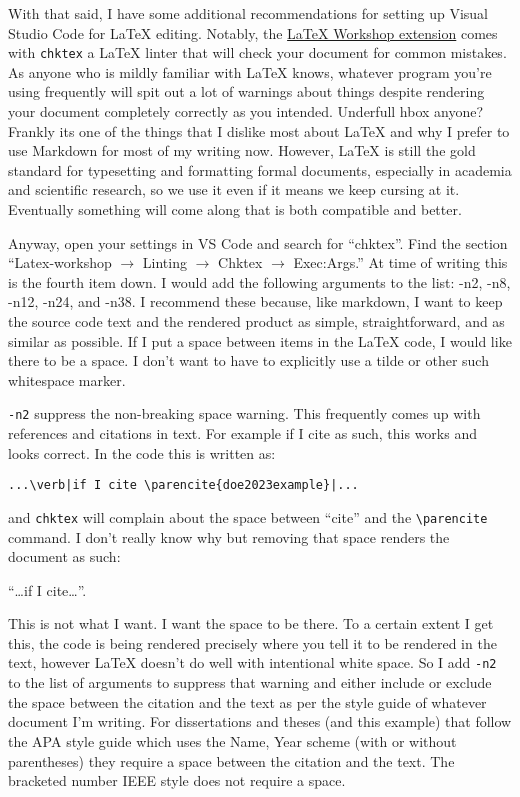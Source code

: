 \documentclass{thesis-dissertation}
\begin{document}
With that said, I have some additional recommendations for setting up Visual Studio Code for \LaTeX{} editing. Notably, the \href{https://marketplace.visualstudio.com/items/?itemName=James-Yu.latex-workshop}{LaTeX Workshop extension} comes with \texttt{chktex} a \LaTeX{} linter that will check your document for common mistakes. As anyone who is mildly familiar with \LaTeX{} knows, whatever program you're using frequently will spit out a lot of warnings about things despite rendering your document completely correctly as you intended. Underfull hbox anyone? Frankly its one of the things that I dislike most about \LaTeX{} and why I prefer to use Markdown for most of my writing now. However, \LaTeX{} is still the gold standard for typesetting and formatting formal documents, especially in academia and scientific research, so we use it even if it means we keep cursing at it. Eventually something will come along that is both compatible and better.

Anyway, open your settings in VS Code and search for ``chktex''. Find the section ``Latex-workshop \(\rightarrow\) Linting \(\rightarrow\) Chktex \(\rightarrow\) Exec:Args.'' At time of writing this is the fourth item down. I would add the following arguments to the list: -n2, -n8, -n12, -n24, and -n38. I recommend these because, like markdown, I want to keep the source code text and the rendered product as simple, straightforward, and as similar as possible. If I put a space between items in the \LaTeX{} code, I would like there to be a space. I don't want to have to explicitly use a tilde or other such whitespace marker. 

\texttt{-n2} suppress the non-breaking space warning. This frequently comes up with references and citations in text. For example if I cite \parencite{doe2023example} as such, this works and looks correct. In the code this is written as:\begin{center}\begin{verbatim}...\verb|if I cite \parencite{doe2023example}|...\end{verbatim}\end{center} and \verb|chktex| will complain about the space between ``cite'' and the \verb|\parencite| command. I don't really know why but removing that space renders the document as such: \begin{center}
``\ldots if I cite\parencite{doe2023example}\ldots''. 
\end{center} This is not what I want. I want the space to be there. To a certain extent I get this, the code is being rendered precisely where you tell it to be rendered in the text, however \LaTeX{} doesn't do well with intentional white space. So I add \texttt{-n2} to the list of arguments to suppress that warning and either include or exclude the space between the citation and the text as per the style guide of whatever document I'm writing. For dissertations and theses (and this example) that follow the APA style guide which uses the Name, Year scheme (with or without parentheses) they require a space between the citation and the text. The bracketed number IEEE style does not require a space.
\end{document}

